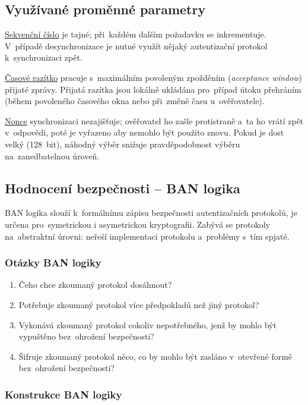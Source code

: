 \subsection{Využívané proměnné parametry}

\uline{Sekvenční číslo} je tajné; při~každém dalším požadavku se inkrementuje.
V~případě desynchronizace je nutné využít nějaký autentizační protokol k~synchronizaci zpět.

\uline{Časové razítko} pracuje s~maximálním povoleným zpožděním (\emph{acceptance window}) přijaté zprávy.
Přijatá razítka jsou lokálně ukládána pro~případ útoku přehráním (během povoleného časového okna nebo při~změně času u~ověřovatele).

\uline{Nonce} synchronizaci nezajišťuje; ověřovatel ho zašle protistraně a~ta ho vrátí zpět v~odpovědi, poté je vyřazeno aby nemohlo být použito znovu.
Pokud je dost velký (128~bit), náhodný výběr snižuje pravděpodobnost výběru na~zanedbatelnou úroveň.


\subsection{Hodnocení bezpečnosti -- BAN logika}

BAN logika slouží k~formálnímu zápisu bezpečnosti autentizačních protokolů, je určena pro~symetrickou i asymetrickou kryptografii.
Zabývá se protokoly na~abstraktní úrovni: neřeší implementaci protokolu a~problémy s~tím spjaté.

\subsubsection{Otázky BAN logiky}

\begin{enumerate}
    \item Čeho chce zkoumaný protokol dosáhnout?
    \item Potřebuje zkoumaný protokol více předpokladů než jiný protokol?
    \item Vykonává zkoumaný protokol cokoliv nepotřebného, jenž by mohlo být vypuštěno bez~ohrožení bezpečnosti?
    \item Šifruje zkoumaný protokol něco, co by mohlo být zasláno v~otevřené formě bez~ohrožení bezpečnosti?
\end{enumerate}

\subsubsection{Konstrukce BAN logiky}

